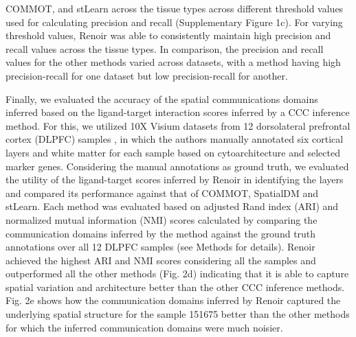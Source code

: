 COMMOT, and stLearn across the tissue types across different threshold values used for calculating precision and recall (Supplementary Figure 1c). For varying threshold values, Renoir was able to consistently maintain high precision and recall values across the tissue types. In comparison, the precision and recall values for the other methods varied across datasets, with a method having high precision-recall for one dataset but low precision-recall for another. \par 

Finally, we evaluated the accuracy of the spatial communications domains inferred based on the ligand-target interaction scores inferred by a CCC inference method. For this, we utilized 10X Visium datasets from 12 dorsolateral prefrontal cortex (DLPFC) samples \citep{Maynard2021}, in which the authors manually annotated six cortical layers and white matter for each sample based on cytoarchitecture and selected marker genes. Considering the manual annotations as ground truth, we evaluated the utility of the ligand-target scores inferred by Renoir in identifying the layers and compared its performance against that of COMMOT, SpatialDM and stLearn. Each method was evaluated based on adjusted Rand index (ARI) and normalized mutual information (NMI) scores calculated by comparing the communication domains inferred by the method against the ground truth annotations over all 12 DLPFC samples (see Methods for details). Renoir achieved the highest ARI and NMI scores considering all the samples and outperformed all the other methods (Fig. 2d) indicating that it is able to capture spatial variation and architecture better than the other CCC inference methods. Fig. 2e shows how the communication domains inferred by Renoir captured the underlying spatial structure for the sample 151675 better than the other methods for which the inferred communication domains were much noisier.



